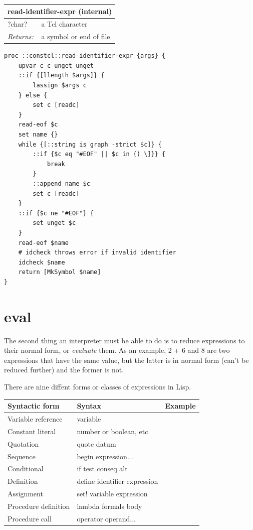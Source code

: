 \documentclass[twoside,9pt]{report}
\begin{document}
\begin{tabular}{ |l l| }
\hline
\multicolumn{2}{|l|}{read-identifier-expr (internal)} \\
\hline
?char? & a Tcl character \\
\textit{Returns:} & a symbol or end of file \\
\hline
\end{tabular}

\noindent\makebox[\linewidth]{\rule{\linewidth}{0.4pt}}
\begin{lstlisting}
proc ::constcl::read-identifier-expr {args} {
    upvar c c unget unget
    ::if {[llength $args]} {
        lassign $args c
    } else {
        set c [readc]
    }
    read-eof $c
    set name {}
    while {[::string is graph -strict $c]} {
        ::if {$c eq "#EOF" || $c in {) \]}} {
            break
        }
        ::append name $c
        set c [readc]
    }
    ::if {$c ne "#EOF"} {
        set unget $c
    }
    read-eof $name
    # idcheck throws error if invalid identifier
    idcheck $name
    return [MkSymbol $name]
}
\end{lstlisting}
\noindent\makebox[\linewidth]{\rule{\linewidth}{0.4pt}}
\section{eval}
\label{eval}

The second thing an interpreter must be able to do is to reduce expressions to their normal form, or \emph{evaluate} them. As an example, 2 + 6 and 8 are two expressions that have the same value, but the latter is in normal form (can't be reduced further) and the former is not.


There are nine diffent forms or classes of expressions in Lisp.

\begin{tabular}{|l l l|}
\hline
Syntactic form & Syntax & Example \\
\hline
Variable reference & variable \\
Constant literal & number or boolean, etc \\
Quotation & quote datum \\
Sequence & begin expression... \\
Conditional & if test conseq alt \\
Definition & define identifier expression \\
Assignment & set! variable expression \\
Procedure definition & lambda formals body \\
Procedure call & operator operand... \\
\hline
\end{tabular}
\end{document}
